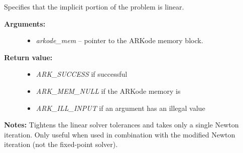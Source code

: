 \documentclass[letterpaper,10pt,english]{sphinxmanual}
\begin{document}
\begin{fulllineitems}
\label{c_interface/User_callable:ARKodeSetLinear}
Specifies that the implicit portion of the problem is linear.
\begin{description}
\item[{\textbf{Arguments:}}] \leavevmode\begin{itemize}
\item {} 
\emph{arkode\_mem} -- pointer to the ARKode memory block.

\end{itemize}

\item[{\textbf{Return value:}}] \leavevmode\begin{itemize}
\item {} 
\emph{ARK\_SUCCESS} if successful

\item {} 
\emph{ARK\_MEM\_NULL} if the ARKode memory is 

\item {} 
\emph{ARK\_ILL\_INPUT} if an argument has an illegal value

\end{itemize}

\end{description}

\textbf{Notes:} Tightens the linear solver tolerances and takes only a
single Newton iteration.  Only useful when used in combination with
the modified Newton iteration (not the fixed-point solver).

\end{fulllineitems}

\end{document}
